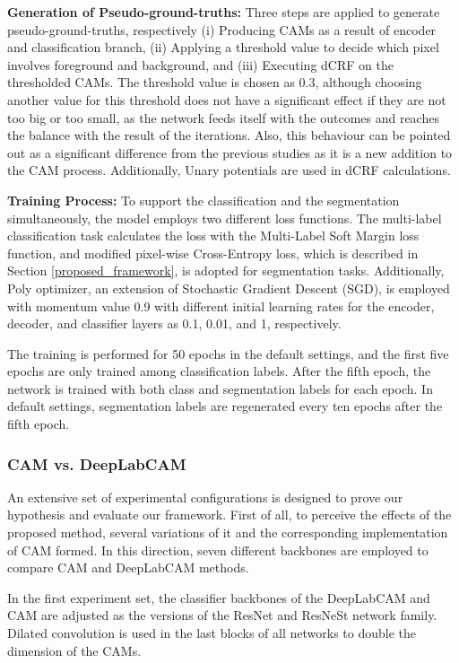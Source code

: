 \documentclass[sn-mathphys]{sn-jnl}
\theoremstyle{thmstyleone}
\theoremstyle{thmstyletwo}\newtheorem{example}{Example}\newtheorem{remark}{Remark}
\theoremstyle{thmstylethree}\newtheorem{definition}{Definition}
\begin{document}
\textbf{Generation of Pseudo-ground-truths:} Three steps are applied to generate pseudo-ground-truths, respectively (i) Producing CAMs as a result of encoder and classification branch, (ii) Applying a threshold value to decide which pixel involves foreground and background, and (iii) Executing dCRF on the thresholded CAMs. The threshold value is chosen as 0.3, although choosing another value for this threshold does not have a significant effect if they are not too big or too small, as the network feeds itself with the outcomes and reaches the balance with the result of the iterations. Also, this behaviour can be pointed out as a significant difference from the previous studies as it is a new addition to the CAM process. Additionally, Unary potentials are used in dCRF calculations.

\textbf{Training Process:} To support the classification and the segmentation simultaneously, the model employs two different loss functions. The multi-label classification task calculates the loss with the Multi-Label Soft Margin loss function, and modified pixel-wise Cross-Entropy loss, which is described in Section \ref{proposed_framework}, is adopted for segmentation tasks. Additionally, Poly optimizer, an extension of Stochastic Gradient Descent (SGD), is employed with momentum value 0.9 with different initial learning rates for the encoder, decoder, and classifier layers as 0.1, 0.01, and 1, respectively. 

The training is performed for 50 epochs in the default settings, and the first five epochs are only trained among classification labels. After the fifth epoch, the network is trained with both class and segmentation labels for each epoch. In default settings, segmentation labels are regenerated every ten epochs after the fifth epoch.  

\subsubsection{CAM vs. DeepLabCAM}

An extensive set of experimental configurations is designed to prove our hypothesis and evaluate our framework. First of all, to perceive the effects of the proposed method, several variations of it and the corresponding implementation of CAM formed. In this direction, seven different backbones are employed to compare CAM and DeepLabCAM methods. 

In the first experiment set, the classifier backbones of the DeepLabCAM and CAM are adjusted as the versions of the ResNet and ResNeSt network family. Dilated convolution is used in the last blocks of all networks to double the dimension of the CAMs.
\end{document}
